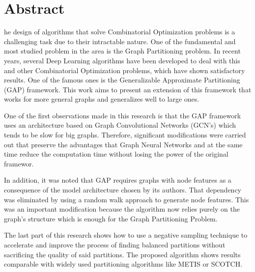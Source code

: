 

\chapter*{Abstract}

he design of algorithms that solve Combinatorial Optimization problems is a challenging task due to their intractable nature. One of the fundamental and most studied problem in the area is the Graph Partitioning problem. In recent years, several Deep Learning algorithms have been developed to deal with this and other Combinatorial Optimization problems, which have shown satisfactory results. One of the famous ones is the Generalizable Approximate Partitioning (GAP) framework. This work aims to present an extension of this framework that works for more general graphs and generalizes well to large ones.

One of the first observations made in this research is that the GAP framework uses an architecture based on Graph Convolutional Networks (GCN's) which tends to be slow for big graphs. Therefore, significant modifications were carried out that preserve the advantages that Graph Neural Networks and at the same time reduce the computation time without losing the power of the original framewor.

In addition, it was noted that GAP requires graphs with node features as a consequence of the model architecture chosen by its authors. That dependency was eliminated by using a random walk approach to generate node features. This was an important modification because the algorithm now relies purely on the graph's structure which is enough for the Graph Partitioning Problem.

The last part of this research shows how to use a negative sampling technique to accelerate and improve the process of finding balanced partitions without sacrificing the quality of said partitions. The proposed algorithm shows results comparable with widely used partitioning algorithms like METIS or SCOTCH.

\clearpage